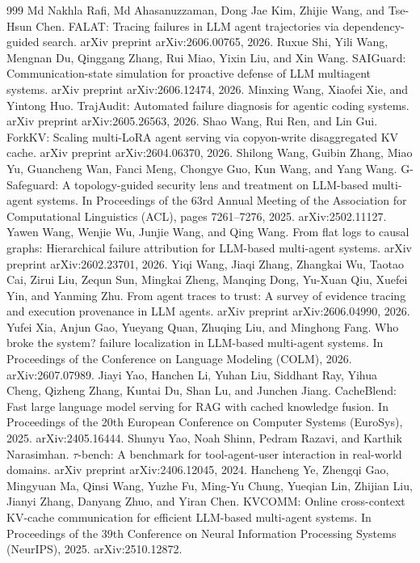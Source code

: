 \documentclass[preprint,12pt]{elsarticle}
\begin{document}
\begin{thebibliography}{999}
 Md Nakhla Rafi, Md Ahasanuzzaman, Dong Jae Kim, Zhijie Wang, and Tse-Hsun Chen. FALAT: Tracing failures in LLM agent trajectories via dependency-guided search. arXiv preprint arXiv:2606.00765, 2026.
 Ruxue Shi, Yili Wang, Mengnan Du, Qinggang Zhang, Rui Miao, Yixin Liu, and Xin Wang. SAIGuard: Communication-state simulation for proactive defense of LLM multiagent systems. arXiv preprint arXiv:2606.12474, 2026.
 Minxing Wang, Xiaofei Xie, and Yintong Huo. TrajAudit: Automated failure diagnosis for agentic coding systems. arXiv preprint arXiv:2605.26563, 2026.
 Shao Wang, Rui Ren, and Lin Gui. ForkKV: Scaling multi-LoRA agent serving via copyon-write disaggregated KV cache. arXiv preprint arXiv:2604.06370, 2026.
 Shilong Wang, Guibin Zhang, Miao Yu, Guancheng Wan, Fanci Meng, Chongye Guo, Kun Wang, and Yang Wang. G-Safeguard: A topology-guided security lens and treatment on LLM-based multi-agent systems. In Proceedings of the 63rd Annual Meeting of the Association for Computational Linguistics (ACL), pages 7261--7276, 2025. arXiv:2502.11127.
 Yawen Wang, Wenjie Wu, Junjie Wang, and Qing Wang. From flat logs to causal graphs: Hierarchical failure attribution for LLM-based multi-agent systems. arXiv preprint arXiv:2602.23701, 2026.
 Yiqi Wang, Jiaqi Zhang, Zhangkai Wu, Taotao Cai, Zirui Liu, Zequn Sun, Mingkai Zheng, Manqing Dong, Yu-Xuan Qiu, Xuefei Yin, and Yanming Zhu. From agent traces to trust: A survey of evidence tracing and execution provenance in LLM agents. arXiv preprint arXiv:2606.04990, 2026.
 Yufei Xia, Anjun Gao, Yueyang Quan, Zhuqing Liu, and Minghong Fang. Who broke the system? failure localization in LLM-based multi-agent systems. In Proceedings of the Conference on Language Modeling (COLM), 2026. arXiv:2607.07989.
 Jiayi Yao, Hanchen Li, Yuhan Liu, Siddhant Ray, Yihua Cheng, Qizheng Zhang, Kuntai Du, Shan Lu, and Junchen Jiang. CacheBlend: Fast large language model serving for RAG with cached knowledge fusion. In Proceedings of the 20th European Conference on Computer Systems (EuroSys), 2025. arXiv:2405.16444.
 Shunyu Yao, Noah Shinn, Pedram Razavi, and Karthik Narasimhan. $\tau$-bench: A benchmark for tool-agent-user interaction in real-world domains. arXiv preprint arXiv:2406.12045, 2024.
 Hancheng Ye, Zhengqi Gao, Mingyuan Ma, Qinsi Wang, Yuzhe Fu, Ming-Yu Chung, Yueqian Lin, Zhijian Liu, Jianyi Zhang, Danyang Zhuo, and Yiran Chen. KVCOMM: Online cross-context KV-cache communication for efficient LLM-based multi-agent systems. In Proceedings of the 39th Conference on Neural Information Processing Systems (NeurIPS), 2025. arXiv:2510.12872.

\end{thebibliography}
\end{document}
